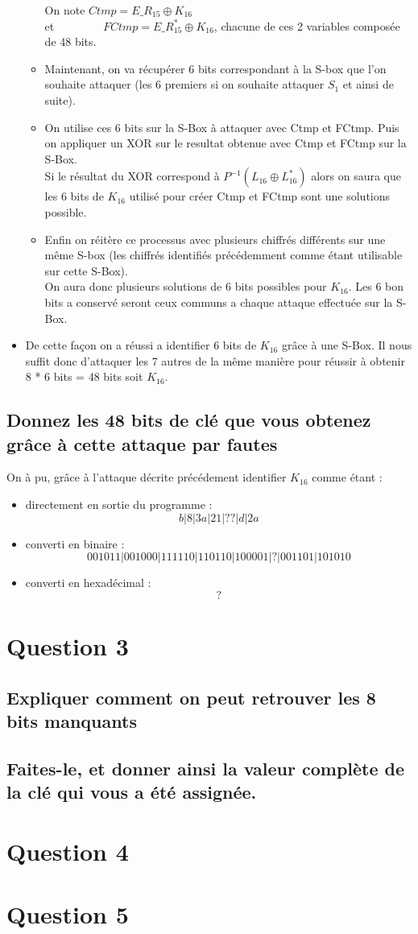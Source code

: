 \documentclass[a4paper,11pt]{article}
\begin{document}
\begin{itemize}
\begin{itemize}
			On note $Ctmp = E\_R_{15} \oplus K_{16}$ \\
			et \ \ \ \ \ \ \ \ $FCtmp = E\_R_{15}^{*} \oplus K_{16}$, chacune de ces 2 variables composée de 48 bits.\\
			\item Maintenant, on va récupérer 6 bits correspondant à la S-box que l'on souhaite attaquer (les 6 premiers si on souhaite attaquer $S_{1}$ et ainsi de suite).
			\item On utilise ces 6 bits sur la S-Box à attaquer avec Ctmp et FCtmp. Puis on appliquer un XOR sur le resultat obtenue avec Ctmp et FCtmp sur la S-Box.\\
			Si le résultat du XOR correspond à  $P^{-1}(L_{16} \oplus L_{16}^{*})$ alors on saura que les 6 bits de $K_{16}$ utilisé pour créer Ctmp et FCtmp sont une solutions possible.
			\item Enfin on réitère ce processus avec plusieurs chiffrés différents sur une même S-box (les chiffrés identifiés précédemment comme étant utilisable sur cette S-Box).\\
			On aura donc plusieurs solutions de 6 bits possibles pour $K_{16}$. Les 6 bon bits a conservé seront ceux communs a chaque attaque effectuée sur la S-Box. 
		\end{itemize}
		\item De cette façon on a réussi a identifier 6 bits de $K_{16}$ grâce à une S-Box. Il nous suffit donc d'attaquer les 7 autres de la même manière pour réussir à obtenir 8 * 6 bits = 48 bits soit $K_{16}$.
	\end{itemize} 
	\subsection{Donnez les 48 bits de clé que vous obtenez grâce à cette attaque par fautes}
	On à pu, grâce à l'attaque décrite précédement identifier $K_{16}$ comme étant :\\
	\begin{itemize}
		\item directement en sortie du programme : $$b|8|3a|21|??|d|2a$$
		\item converti en binaire : $$001011|001000|111110|110110|100001|?|001101|101010$$
		\item converti en hexadécimal : $$? $$
	\end{itemize}
	
	\section{Question 3}
	\subsection{Expliquer comment on peut retrouver les 8 bits manquants}
	\subsection{Faites-le, et donner ainsi la valeur complète de la clé qui vous a été assignée.}
	
	\section{Question 4}
	
	\section{Question 5}
\end{document}

